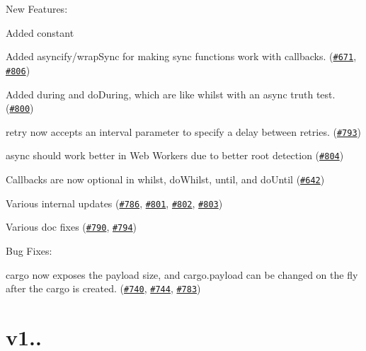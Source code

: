New Features\+:
\begin{DoxyItemize}
\item Added {\ttfamily constant}
\item Added {\ttfamily asyncify}/{\ttfamily wrap\+Sync} for making sync functions work with callbacks. (\href{https://github.com/caolan/async/issues/671}{\tt \#671}, \href{https://github.com/caolan/async/issues/806}{\tt \#806})
\item Added {\ttfamily during} and {\ttfamily do\+During}, which are like {\ttfamily whilst} with an async truth test. (\href{https://github.com/caolan/async/issues/800}{\tt \#800})
\item {\ttfamily retry} now accepts an {\ttfamily interval} parameter to specify a delay between retries. (\href{https://github.com/caolan/async/issues/793}{\tt \#793})
\item {\ttfamily async} should work better in Web Workers due to better {\ttfamily root} detection (\href{https://github.com/caolan/async/issues/804}{\tt \#804})
\item Callbacks are now optional in {\ttfamily whilst}, {\ttfamily do\+Whilst}, {\ttfamily until}, and {\ttfamily do\+Until} (\href{https://github.com/caolan/async/issues/642}{\tt \#642})
\item Various internal updates (\href{https://github.com/caolan/async/issues/786}{\tt \#786}, \href{https://github.com/caolan/async/issues/801}{\tt \#801}, \href{https://github.com/caolan/async/issues/802}{\tt \#802}, \href{https://github.com/caolan/async/issues/803}{\tt \#803})
\item Various doc fixes (\href{https://github.com/caolan/async/issues/790}{\tt \#790}, \href{https://github.com/caolan/async/issues/794}{\tt \#794})
\end{DoxyItemize}

Bug Fixes\+:
\begin{DoxyItemize}
\item {\ttfamily cargo} now exposes the {\ttfamily payload} size, and {\ttfamily cargo.\+payload} can be changed on the fly after the {\ttfamily cargo} is created. (\href{https://github.com/caolan/async/issues/740}{\tt \#740}, \href{https://github.com/caolan/async/issues/744}{\tt \#744}, \href{https://github.com/caolan/async/issues/783}{\tt \#783})
\end{DoxyItemize}

\section*{v1..}

